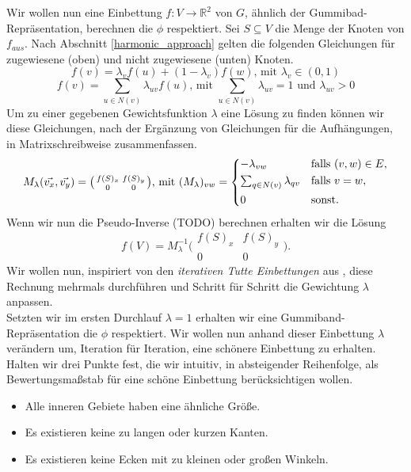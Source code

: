 Wir wollen nun eine Einbettung $f:V\to \mathbb{R}^2$ von $G$, ähnlich der Gummibad-Repräsentation, berechnen die $\phi$ respektiert. Sei $S \subseteq V$ die Menge der Knoten von $f_{aus}$. Nach Abschnitt \ref{harmonic_approach} gelten die folgenden Gleichungen für zugewiesene (oben) und nicht zugewiesene (unten) Knoten.
$$ f(v) = \lambda_v f(u) + (1-\lambda_v)f(w) \text{, mit } \lambda_v \in (0,1) $$
$$ f(v) = \sum_{u \in N(v)} \lambda_{uv} f(u) \text{, mit }  \sum_{u \in N(v)}\lambda_{uv} = 1 \text{ und } \lambda_{uv} > 0 $$
Um zu einer gegebenen Gewichtsfunktion $\lambda$ eine Lösung zu finden können wir diese Gleichungen, nach der Ergänzung von Gleichungen für die Aufhängungen, in Matrixschreibweise zusammenfassen.
\[ M_{\lambda}(\vec{v_x},\vec{v_y}) = \big( \begin{smallmatrix}f(S)_x&f(S)_y\\ 0&0\end{smallmatrix} \big) \text{, mit } (M_{\lambda})_{vw} =
	\begin{dcases}
	-\lambda_{vw} & \text{falls } (v,w) \in E, \\
	\textstyle\sum_{q \in N(v)} \lambda_{qv} & \text{falls } v = w, \\
	0 & \text{sonst.} \\
	\end{dcases}
\]
Wenn wir nun die Pseudo-Inverse (TODO) berechnen erhalten wir die Lösung
$$f(V) = M_{\lambda}^{-1}\big( \begin{smallmatrix}f(S)_x&f(S)_y\\ 0&0\end{smallmatrix} \big).$$
Wir wollen nun, inspiriert von den \textit{iterativen Tutte Einbettungen} aus \cite{fs17}, diese Rechnung mehrmals durchführen und Schritt für Schritt die Gewichtung $\lambda$ anpassen.\\

Setzten wir im ersten Durchlauf $\lambda = 1$ erhalten wir eine Gummiband-Repräsentation die $\phi$ respektiert. Wir wollen nun anhand dieser Einbettung $\lambda$ verändern um, Iteration für Iteration, eine \glqq schönere\grqq{ } Einbettung zu erhalten. Halten wir drei Punkte fest, die wir intuitiv, in absteigender Reihenfolge, als Bewertungsmaßstab für eine schöne Einbettung berücksichtigen wollen.
\begin{itemize}
\item Alle inneren Gebiete haben eine ähnliche Größe.
\item Es existieren keine zu langen oder kurzen Kanten.
\item Es existieren keine Ecken mit zu kleinen oder großen Winkeln.
\end{itemize}

